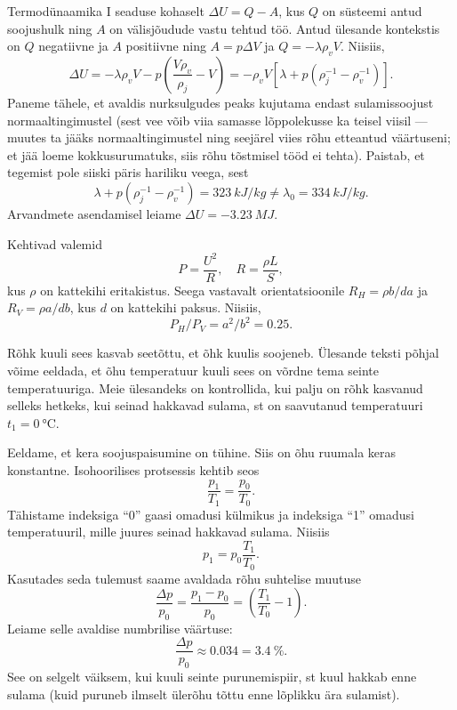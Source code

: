 \documentclass[10pt, twoside]{article}
\begin{document}
{%

\solu
Termodünaamika I seaduse kohaselt $\Delta U = Q - A$, kus $Q$ on süsteemi antud soojushulk ning $A$ on välisjõudude vastu tehtud töö. Antud ülesande kontekstis on $Q$ negatiivne ja $A$ positiivne ning $A = p\Delta V$ ja $Q = -\lambda \rho_vV$. Niisiis,
\[
\Delta U=-\lambda \rho_{v} V-p\left(\frac{V \rho_{v}}{\rho_{j}}-V\right)=-\rho_{v} V\left[\lambda+p\left(\rho_{j}^{-1}-\rho_{v}^{-1}\right)\right].
\]
Paneme tähele, et avaldis nurksulgudes peaks kujutama endast sulamissoojust normaaltingimustel (sest vee võib viia samasse lõppolekusse ka teisel viisil --- muutes ta jääks normaaltingimustel ning seejärel viies rõhu etteantud väärtuseni; et jää loeme kokkusurumatuks, siis rõhu tõstmisel tööd ei tehta). Paistab, et tegemist pole siiski päris hariliku veega, sest
\[
\lambda+p\left(\rho_{j}^{-1}-\rho_{v}^{-1}\right)= \SI{323}{kJ/kg} \neq \lambda_{0}=\SI{334}{kJ/kg}.
\]
Arvandmete asendamisel leiame $\Delta U = \SI{-3,23}{MJ}$.
\probend
\bigskip


\solu
Kehtivad valemid
\[
P=\frac{U^{2}}{R}, \quad R=\frac{\rho L}{S},
\]
kus $\rho$ on kattekihi eritakistus. Seega vastavalt orientatsioonile $R_H = \rho b/da$ ja $R_V = \rho a/db$, kus $d$ on kattekihi paksus. Niisiis,
\[
P_H/P_V = a ^2/b^2 = \num{0,25}.
\]
\probend
\bigskip


\solu
Rõhk kuuli sees kasvab seetõttu, et õhk kuulis soojeneb. Ülesande teksti põhjal võime eeldada, et õhu temperatuur kuuli sees on võrdne tema seinte temperatuuriga. Meie ülesandeks on kontrollida, kui palju on rõhk kasvanud selleks hetkeks, kui seinad hakkavad sulama, st on saavutanud temperatuuri $t_1 = \SI{0}{\degreeCelsius}$. 

Eeldame, et kera soojuspaisumine on tühine. Siis on õhu ruumala keras konstantne. Isohoorilises protsessis kehtib seos 
\[
\frac{p_1}{T_1} = \frac{p_0}{T_0}.
\]
Tähistame indeksiga \enquote{0} gaasi omadusi külmikus ja indeksiga \enquote{1} omadusi temperatuuril, mille juures seinad hakkavad sulama. Niisiis 
\[
p_1 = p_0 \frac{T_1}{T_0}.
\] 
Kasutades seda tulemust saame avaldada rõhu suhtelise muutuse 
\[
\frac{\Delta p}{p_{0}}=\frac{p_{1}-p_{0}}{p_{0}}=\left(\frac{T_{1}}{T_{0}}-1\right).
\]
Leiame selle avaldise numbrilise väärtuse: 
\[
\frac{\Delta p}{p_0} \approx \num{0,034} = \SI{3,4}{\%}.
\] 
See on selgelt väiksem, kui kuuli seinte purunemispiir, st kuul hakkab enne sulama (kuid puruneb ilmselt ülerõhu tõttu enne lõplikku ära sulamist). 

}
\end{document}
